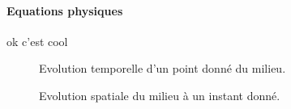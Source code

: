 \paragraph{Equations physiques}
ok
c'est cool
\begin{figure}[h]
    \centering
    \begin{minipage}{0.45\textwidth}
        \centering
        \caption{Evolution temporelle d'un point donné du milieu.~\cite{propagation-onde}}
    \end{minipage}
    \hfill
    \begin{minipage}{0.45\textwidth}
        \centering
        \caption{Evolution spatiale du milieu à un instant donné.~\cite{propagation-onde}}
    \end{minipage}
\end{figure}

